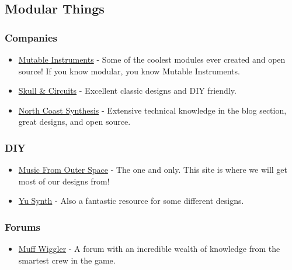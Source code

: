 \documentclass{article}
\begin{document}
\subsection{Modular Things}

\subsubsection{Companies}
\begin{itemize}
	\item \href{https://mutable-instruments.net}{Mutable Instruments} - Some of the coolest modules ever created and open source! If you know modular, you know Mutable Instruments.
	\item \href{https://www.skullandcircuits.com}{Skull \& Circuits} - Excellent classic designs and DIY friendly.
	\item \href{https://northcoastsynthesis.com}{North Coast Synthesis} - Extensive technical knowledge in the blog section, great designs, and open source.
\end{itemize}

\subsubsection{DIY}
\begin{itemize}
	\item \href{http://musicfromouterspace.com}{Music From Outer Space} - The one and only. This site is where we will get most of our designs from!
	\item \href{https://yusynth.net/index_en.php}{Yu Synth} - Also a fantastic resource for some different designs.
\end{itemize}

\subsubsection{Forums}
\begin{itemize}
	\item \href{https://www.muffwiggler.com/forum/index.php}{Muff Wiggler} - A forum with an incredible wealth of knowledge from the smartest crew in the game.
\end{itemize}
\end{document}
